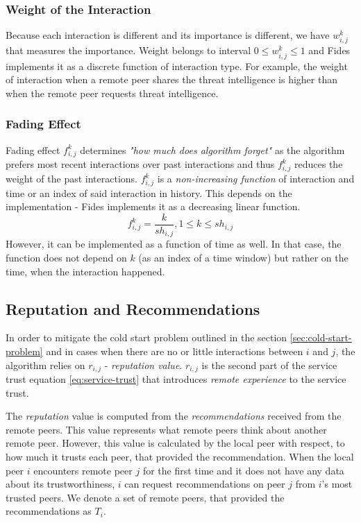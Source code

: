 \subsubsection{Weight of the Interaction}
Because each interaction is different and its importance is different, we have $w^{k}_{i,j}$ that measures the importance.
Weight belongs to interval $0 \leq w^{k}_{i,j} \leq 1$ and Fides implements it as a discrete function of interaction type. 
For example, the weight of interaction when a remote peer shares the threat intelligence is higher than when the remote peer requests threat intelligence.


\subsubsection{Fading Effect}
Fading effect $f^{k}_{i,j}$ determines \textit{"how much does algorithm forget"} as the algorithm prefers most recent interactions over past interactions and thus $f^{k}_{i,j}$ reduces the weight of the past interactions. 
$f^{k}_{i,j}$ is a \textit{non-increasing function} of interaction and time or an index of said interaction in history.
This depends on the implementation - Fides implements it as a decreasing linear function.
\begin{equation}
    f^{k}_{i,j} = \frac{k}{sh_{i,j}}, 1 \leq k \leq sh_{i,j}
\end{equation}
However, it can be implemented as a function of time as well. In that case, the function does not depend on $k$ (as an index of a time window) but rather on the time, when the interaction happened.

\subsection{Reputation and Recommendations}
In order to mitigate the cold start problem outlined in the section \ref{sec:cold-start-problem} and in cases when there are no or little interactions between $i$ and $j$, the algorithm relies on $r_{i,j}$ - \textit{reputation value}. 
$r_{i,j}$ is the second part of the service trust equation \ref{eq:service-trust} that introduces \textit{remote experience} to the service trust.

The \textit{reputation} value is computed from the \textit{recommendations} received from the remote peers. This value represents what remote peers think about another remote peer. However, this value is calculated by the local peer with respect, to how much it trusts each peer, that provided the recommendation.
When the local peer $i$ encounters remote peer $j$ for the first time and it does not have any data about its trustworthiness, $i$ can request recommendations on peer $j$ from $i$'s most trusted peers.
We denote a set of remote peers, that provided the recommendations as $T_{i}$.

